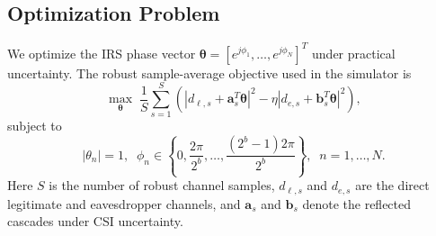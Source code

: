 \subsection{Optimization Problem}
We optimize the IRS phase vector $\boldsymbol{\theta} = [e^{j\phi_1}, \ldots, e^{j\phi_N}]^{T}$ under practical uncertainty.
The robust sample-average objective used in the simulator is
\begin{equation}
\max_{\boldsymbol{\theta}} \; \frac{1}{S}\sum_{s=1}^{S}\left(\left|d_{\ell,s} + \mathbf{a}_{s}^{T}\boldsymbol{\theta}\right|^{2} - \eta \left|d_{e,s} + \mathbf{b}_{s}^{T}\boldsymbol{\theta}\right|^{2}\right),
\label{eq:robust_obj}
\end{equation}
subject to
\begin{equation}
|\theta_n| = 1,\;\; \phi_n \in \left\{0, \frac{2\pi}{2^b}, \ldots, \frac{(2^b-1)2\pi}{2^b}\right\}, \;\; n=1,\ldots,N.
\label{eq:phase_constraint}
\end{equation}
Here $S$ is the number of robust channel samples, $d_{\ell,s}$ and $d_{e,s}$ are the direct legitimate and eavesdropper channels, and $\mathbf{a}_s$ and $\mathbf{b}_s$ denote the reflected cascades under CSI uncertainty.
